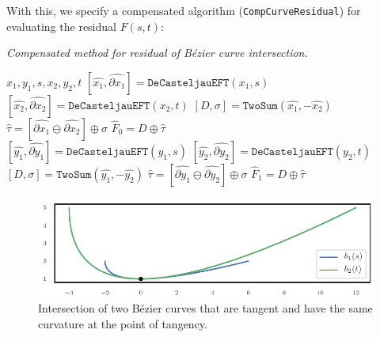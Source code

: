 With this, we specify a compensated algorithm (\texttt{CompCurveResidual})
for evaluating the residual \(F(s, t)\):
\begin{breakablealgorithm}
  \caption{\textit{Compensated method for residual of
      B\'{e}zier curve intersection.}}
  \label{alg:compensated-residual}

  \begin{algorithmic}
             {$x_1, y_1, s, x_2, y_2, t$}
      \State \(\left[\widehat{x_1}, \widehat{\partial x_1}\right] =
        \mathtt{DeCasteljauEFT}(x_1, s)\)
      \State \(\left[\widehat{x_2}, \widehat{\partial x_2}\right] =
        \mathtt{DeCasteljauEFT}(x_2, t)\)
      \State \(\left[D, \sigma\right] = \mathtt{TwoSum}(
        \widehat{x_1}, -\widehat{x_2})\)
      \State \(\widehat{\tau} = \left[\widehat{\partial x_1} \ominus
        \widehat{\partial x_2}\right] \oplus \sigma\)
      \State \(\widehat{F}_0 = D \oplus \widehat{\tau}\)
      \\
      \State \(\left[\widehat{y_1}, \widehat{\partial y_1}\right] =
        \mathtt{DeCasteljauEFT}(y_1, s)\)
      \State \(\left[\widehat{y_2}, \widehat{\partial y_2}\right] =
        \mathtt{DeCasteljauEFT}(y_2, t)\)
      \State \(\left[D, \sigma\right] = \mathtt{TwoSum}(
        \widehat{y_1}, -\widehat{y_2})\)
      \State \(\widehat{\tau} = \left[\widehat{\partial y_1} \ominus
        \widehat{\partial y_2}\right] \oplus \sigma\)
      \State \(\widehat{F}_1 = D \oplus \widehat{\tau}\)
    \EndFunction
  \end{algorithmic}
\end{breakablealgorithm}

\begin{figure}
  \includegraphics{../images/compensated-newton/tangent_intersection.pdf}
  \centering
  \captionsetup{width=.75\linewidth}
  \caption{Intersection of two B\'{e}zier curves that are tangent and have
    the same curvature at the point of tangency.}
  \label{fig:tangent-intersection}
\end{figure}

